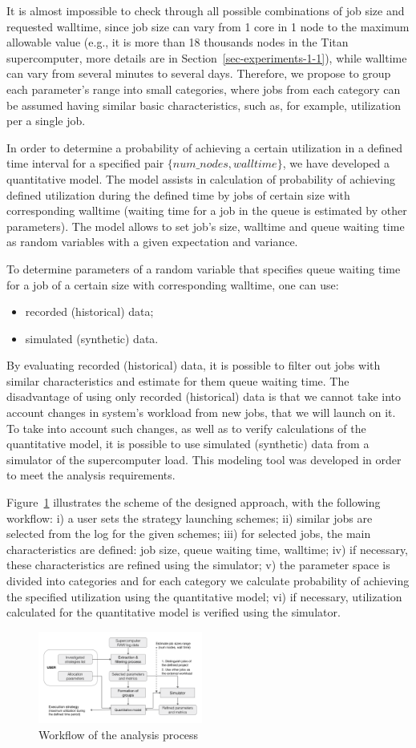 It is almost impossible to check through all possible combinations of job
size and requested walltime, since job size can vary from 1 core in 1 node
to the maximum allowable value (e.g., it is more than 18 thousands nodes in
the Titan supercomputer, more details are in
Section~\ref{sec-experiments-1-1}), while walltime can vary from several
minutes to several days. Therefore, we propose to group each parameter's
range into small categories, where jobs from each category can be assumed having
similar basic characteristics, such as, for example, utilization per a
single job.

In order to determine a probability of achieving a certain utilization in a
defined time interval for a specified pair $\{num\_nodes, walltime\}$, we
have developed a quantitative model. The model assists in calculation of
probability of achieving defined utilization during the defined time by jobs
of certain size with corresponding walltime (waiting time for a job in the
queue is estimated by other parameters). The model allows to set job's size,
walltime and queue waiting time as random variables with a given expectation
and variance.

To determine parameters of a random variable that specifies queue waiting
time for a job of a certain size with corresponding walltime, one can use:
\begin{itemize}
    \item recorded (historical) data;
    \item simulated (synthetic) data.
\end{itemize}

By evaluating recorded (historical) data, it is possible to filter out jobs
with similar characteristics and estimate for them queue waiting time. The
disadvantage of using only recorded (historical) data is that we cannot take
into account changes in system's workload from new jobs, that we will launch
on it. To take into account such changes, as well as to verify calculations
of the quantitative model, it is possible to use simulated (synthetic) data
from a simulator of the supercomputer load. This modeling tool was developed in
order to meet the analysis requirements.

Figure~\ref{fig-analysis-workflow} illustrates the scheme of the designed
approach, with the following workflow: i) a user sets the strategy launching
schemes; ii) similar jobs are selected from the log for the given schemes;
iii) for selected jobs, the main characteristics are defined: job size, queue
waiting time, walltime; iv) if necessary, these characteristics are refined
using the simulator; v) the parameter space is divided into categories and for
each category we calculate probability of achieving the specified utilization
using the quantitative model; vi) if necessary, utilization calculated for the
quantitative model is verified using the simulator.

\begin{figure}
    \centering
    \includegraphics[width=0.48\textwidth]{pics/analysis-workflow.png}
    \caption{Workflow of the analysis process}
    \label{fig-analysis-workflow} 
\end{figure}
